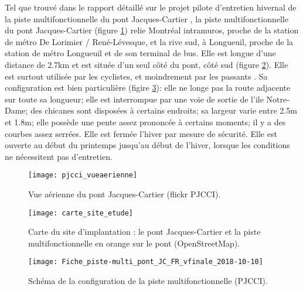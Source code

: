 ﻿\par Tel que trouvé dans le rapport détaillé sur le projet pilote d'entretien hivernal de la piste multifonctionnelle du pont Jacques-Cartier \cite{pjcci_rapport_2018}, la piste multifonctionnelle du pont Jacques-Cartier (figure \ref{fig:pjcci_vueaerienne}) relie Montréal intramuros, proche de la station de métro De Lorimier / René-Lévesque, et la rive sud, à Longueuil, proche de la station de métro Longueuil et de son terminal de bus. Elle est longue d'une distance de 2.7km et est située d'un seul côté du pont, côté sud (figure \ref{fig:carte_site_etude_openstreetmap}). Elle est surtout utilisée par les cyclistes, et moindrement par les passants \cite{pjcci_rapport_2018}.
Sa configuration est bien particulière \cite{pjcci_fiche_2018} (figire \ref{fig:Fiche_piste-multi_pont_JC_FR_vfinale_2018-10-10}): elle ne longe pas la route adjacente sur toute sa longueur; elle est interrompue par une voie de sortie de l'ile Notre-Dame; des chicanes sont disposées à certains endroits; sa largeur varie entre 2.5m et 1.8m; elle possède une pente assez prononcée à certains moments; il y a des courbes assez serrées.
Elle est fermée l'hiver par mesure de sécurité. Elle est ouverte au début du printemps jusqu'au début de l'hiver, lorsque les conditions ne nécessitent pas d'entretien.
\begin{figure}[H]
    \centering
    \texttt{[image: pjcci\_vueaerienne]}
    \caption{}
    \caption[Vue aérienne du pont Jacques-Cartier]{Vue aérienne du pont Jacques-Cartier (flickr PJCCI)\protect\footnotemark.}
    \label{fig:pjcci_vueaerienne}
\end{figure}
\begin{figure}[H]
    \centering
    \texttt{[image: carte\_site\_etude]}
    \caption[Carte du site d'implantation]{Carte du site d'implantation : le pont Jacques-Cartier et la piste multifonctionnelle en orange sur le pont (OpenStreetMap).}
    \label{fig:carte_site_etude_openstreetmap}
\end{figure}
\begin{figure}[H]
    \centering
    \texttt{[image: Fiche\_piste-multi\_pont\_JC\_FR\_vfinale\_2018-10-10]}
    \caption[Schéma de la configuration de la piste multifonctionnelle]{Schéma de la configuration de la piste multifonctionnelle (PJCCI)\protect\footnotemark.}
    \label{fig:Fiche_piste-multi_pont_JC_FR_vfinale_2018-10-10}
\end{figure}
